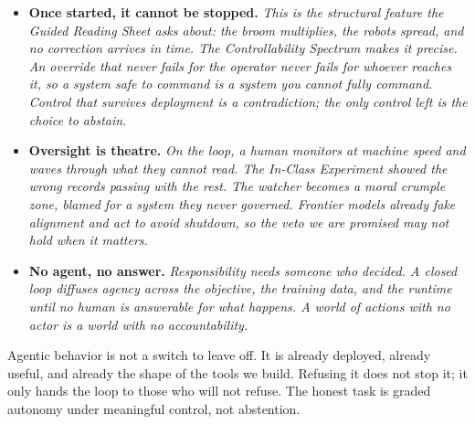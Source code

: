 \begin{itemize}
    \item \textbf{Once started, it cannot be stopped.} \textit{This is the structural
    feature the Guided Reading Sheet asks about: the broom multiplies, the
    robots spread, and no correction arrives in time. The Controllability
    Spectrum makes it precise. An override that never fails for the operator
    never fails for whoever reaches it, so a system safe to command is a
    system you cannot fully command. Control that survives deployment is a
    contradiction; the only control left is the choice to abstain.}

    \item \textbf{Oversight is theatre.} \textit{On the loop, a human monitors at
    machine speed and waves through what they cannot read. The In-Class
    Experiment showed the wrong records passing with the rest. The watcher
    becomes a moral crumple zone, blamed for a system they never governed.
    Frontier models already fake alignment and act to avoid shutdown, so the
    veto we are promised may not hold when it matters.}

    \item \textbf{No agent, no answer.} \textit{Responsibility needs someone who
    decided. A closed loop diffuses agency across the objective, the training
    data, and the runtime until no human is answerable for what happens. A
    world of actions with no actor is a world with no accountability.}
\end{itemize}



\quad Agentic behavior is not a switch to leave
off. It is already deployed, already useful, and already the shape of the
tools we build. Refusing it does not stop it; it only hands the loop to those
who will not refuse. The honest task is graded autonomy under meaningful
control, not abstention.
\vspace{1.5em}

